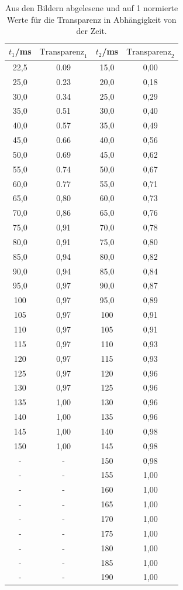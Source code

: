 \begin{table}[htp]
	\begin{center}
    \caption{Aus den Bildern abgelesene und auf 1 normierte Werte für die Transparenz in Abhängigkeit von der Zeit.}
    \label{tab:flanke}
		\begin{tabular}{cccc}
		\toprule
			{$t_1$/ms} & {$\text{Transparenz}_1$} & {$t_2$/ms} & {$\text{Transparenz}_2$}\\
			\midrule
			22,5 & 0.09 & 15,0 & 0,00\\
			25,0 & 0.23 & 20,0 & 0,18\\
			30,0 & 0.34 & 25,0 & 0,29\\
			35,0 & 0.51 & 30,0 & 0,40\\
			40,0 & 0.57 & 35,0 & 0,49\\
			45,0 & 0.66 & 40,0 & 0,56\\
			50,0 & 0.69 & 45,0 & 0,62\\
			55,0 & 0.74 & 50,0 & 0,67\\
			60,0 & 0.77 & 55,0 & 0,71\\
			65,0 & 0,80 & 60,0 & 0,73\\
			70,0 & 0,86 & 65,0 & 0,76\\
			75,0 & 0,91 & 70,0 & 0,78\\
			80,0 & 0,91 & 75,0 & 0,80\\
			85,0 & 0,94 & 80,0 & 0,82\\
			90,0 & 0,94 & 85,0 & 0,84\\
			95,0 & 0,97 & 90,0 & 0,87\\
			100 & 0,97 & 95,0 & 0,89\\
			105 & 0,97 & 100 & 0,91\\
			110 & 0,97 & 105 & 0,91\\
			115 & 0,97 & 110 & 0,93\\
			120 & 0,97 & 115 & 0,93\\
			125 & 0,97 & 120 & 0,96\\
			130 & 0,97 & 125 & 0,96\\
			135 & 1,00 & 130 & 0,96\\
			140 & 1,00 & 135 & 0,96\\
			145 & 1,00 & 140 & 0,98\\
			150 & 1,00 & 145 & 0,98\\
			- & - & 150 & 0,98\\
			- & - & 155 & 1,00\\
			- & - & 160 & 1,00\\
			- & - & 165 & 1,00\\
			- & - & 170 & 1,00\\
			- & - & 175 & 1,00\\
			- & - & 180 & 1,00\\
			- & - & 185 & 1,00\\
			- & - & 190 & 1,00\\
		\bottomrule
		\end{tabular}
	\end{center}
\end{table}

